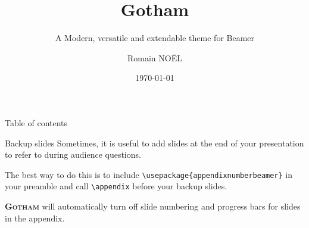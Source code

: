 \documentclass[notheorems, noamsthm, aspectratio=43, 10pt]{beamer}
\title[]{Gotham}
\subtitle{A Modern, versatile and extendable theme for Beamer}
\date[]{\today}
\author[]{Romain NOËL}
\institute{Center for modern beamer themes}
\newcommand{\themename}{\textbf{\textsc{Gotham}}}
\begin{document}
\maketitle

   \begin{frame}[toc]{Table of contents}%
      \tableofcontents%
   \end{frame}

   







\appendix

   \begin{frame}[fragile]{Backup slides}
      Sometimes, it is useful to add slides at the end of your presentation to refer to during audience questions.

      The best way to do this is to include \verb|\usepackage{appendixnumberbeamer}| in your preamble and call \verb|\appendix| before your backup slides.

      \themename{} will automatically turn off slide numbering and progress bars for slides in the appendix.
   \end{frame}
\end{document}
